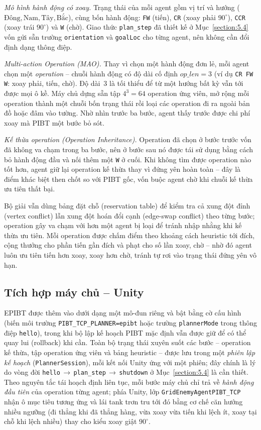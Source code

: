 \documentclass[../DoAn.tex]{subfiles}
\begin{document}
\emph{Mô hình hành động có xoay.} Trạng thái của mỗi agent gồm vị trí và hướng
($\text{Đông}, \text{Nam}, \text{Tây}, \text{Bắc}$), cùng bốn hành động: \texttt{FW}
(tiến), \texttt{CR} (xoay phải $90^\circ$), \texttt{CCR} (xoay trái $90^\circ$) và
\texttt{W} (chờ). Giao thức \texttt{plan\_step} đã thiết kế ở Mục~\ref{section:5.4} vốn
gửi sẵn trường \texttt{orientation} và \texttt{goalLoc} cho từng agent, nên không cần
đổi định dạng thông điệp.

\emph{Multi-action Operation (MAO).} Thay vì chọn một hành động đơn lẻ, mỗi agent chọn
một \emph{operation} -- chuỗi hành động có độ dài cố định $op\_len = 3$ (ví dụ
\texttt{CR\,FW\,W}: xoay phải, tiến, chờ). Độ dài~3 là tối thiểu để từ một hướng bất
kỳ vẫn tới được mọi ô kề. Máy chủ dựng sẵn tập $4^3 = 64$ operation ứng viên, mở rộng
mỗi operation thành một chuỗi bốn trạng thái rồi loại các operation đi ra ngoài bản đồ
hoặc đâm vào tường. Nhờ nhìn trước ba bước, agent thấy trước được chi phí xoay mà PIBT
một bước bỏ sót.

\emph{Kế thừa operation (Operation Inheritance).} Operation đã chọn ở bước trước vốn đã
không va chạm trong ba bước, nên ở bước sau nó được tái sử dụng bằng cách bỏ hành động
đầu và nối thêm một \texttt{W} ở cuối. Khi không tìm được operation nào tốt hơn, agent
giữ lại operation kế thừa thay vì đứng yên hoàn toàn -- đây là điểm khác biệt then chốt
so với PIBT gốc, vốn buộc agent chờ khi chuỗi kế thừa ưu tiên thất bại.

Bộ giải vẫn dùng bảng đặt chỗ (reservation table) để kiểm tra cả xung đột đỉnh
(vertex conflict) lẫn xung đột hoán đổi cạnh (edge-swap conflict) theo từng bước;
operation gây va chạm với hơn một agent bị loại để tránh nhập nhằng khi kế thừa ưu
tiên. Mỗi operation được chấm điểm theo khoảng cách heuristic tới đích, cộng thưởng cho
phần tiến gần đích và phạt cho số lần xoay, chờ -- nhờ đó agent luôn ưu tiên tiến hơn
xoay, xoay hơn chờ, tránh tự rơi vào trạng thái đứng yên vô hạn.

\subsection*{Tích hợp máy chủ -- Unity}
EPIBT được thêm vào dưới dạng một mô-đun riêng và bật bằng cờ cấu hình (biến môi trường
\texttt{PIBT\_TCP\_PLANNER=epibt} hoặc trường \texttt{plannerMode} trong thông điệp
\texttt{hello}), trong khi bộ lập kế hoạch PIBT mặc định vẫn được giữ để có thể quay
lui (rollback) khi cần. Toàn bộ trạng thái xuyên suốt các bước -- operation kế thừa,
tập operation ứng viên và bảng heuristic -- được lưu trong một \emph{phiên lập kế
hoạch} (\texttt{PlannerSession}), mỗi kết nối Unity ứng với một phiên; đây chính là lý
do vòng đời \texttt{hello}\,$\to$\,\texttt{plan\_step}\,$\to$\,\texttt{shutdown} ở
Mục~\ref{section:5.4} là cần thiết. Theo nguyên tắc tái hoạch định liên tục, mỗi bước
máy chủ chỉ trả về \emph{hành động đầu tiên} của operation từng agent; phía Unity, lớp
\texttt{GridEnemyAgentPIBT\_TCP} nhận ô mục tiêu tương ứng và lái tank trơn tru tới đó
bằng cơ chế căn hướng nhiều ngưỡng (đi thẳng khi đã thẳng hàng, vừa xoay vừa tiến khi
lệch ít, xoay tại chỗ khi lệch nhiều) thay cho kiểu xoay giật $90^\circ$.
\end{document}
